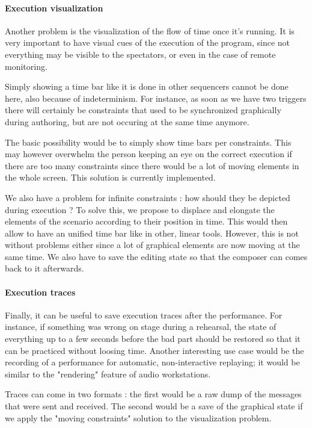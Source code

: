 \documentclass{sigchi}
\begin{document}
\paragraph{Execution visualization}
Another problem is the visualization of the flow of time once it's running. It is very important to have visual cues of the execution of the program, since not everything may be visible to the spectators, or even in the case of remote monitoring.

Simply showing a time bar like it is done in other sequencers cannot be done here, also because of indeterminism.
For instance, as soon as we have two triggers there will certainly be constraints that used to be synchronized graphically during authoring, but are not occuring at the same time anymore.

The basic possibility would be to simply show time bars per constraints. This may however overwhelm the person keeping an eye on the correct execution if there are too many constraints since there would be a lot of moving elements in the whole screen. This solution is currently implemented.

We also have a problem for infinite constraints : how should they be depicted during execution ? To solve this, we propose to displace and elongate the elements of the scenario according to their position in time. This would then allow to have an unified time bar like in other, linear tools. However, 
this is not without problems either since a lot of graphical elements are now moving at the same time. We also have to save the editing state so that the composer can comes back to it afterwards.

\paragraph{Execution traces}
Finally, it can be useful to save execution traces after the performance. For instance, if something was wrong on stage during a rehearsal, the state of everything up to a few seconds before the bad part should be restored so that it can be practiced without loosing time.
Another interesting use case would be the recording of a performance for automatic, non-interactive replaying; it would be similar to the "rendering" feature of audio workstations.

Traces can come in two formats : the first would be a raw dump of the messages that were sent and received.
The second would be a save of the graphical state if we apply the "moving constraints" solution to the visualization problem.
\end{document}
